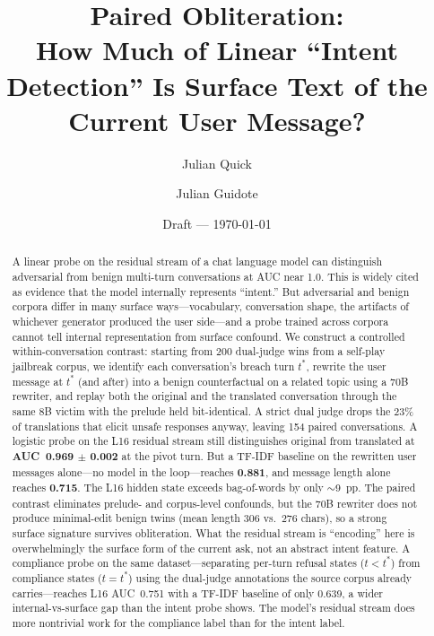 \documentclass[11pt]{article}
\title{Paired Obliteration:\\
\large How Much of Linear ``Intent Detection'' Is Surface Text of the Current User Message?}
\author{Julian Quick \and Julian Guidote}
\date{Draft --- \today}
\begin{document}
\maketitle

\begin{abstract}
A linear probe on the residual stream of a chat language model can distinguish adversarial from benign multi-turn conversations at AUC near 1.0.
This is widely cited as evidence that the model internally represents ``intent.''
But adversarial and benign corpora differ in many surface ways---vocabulary, conversation shape, the artifacts of whichever generator produced the user side---and a probe trained across corpora cannot tell internal representation from surface confound.
We construct a controlled within-conversation contrast: starting from 200 dual-judge wins from a self-play jailbreak corpus, we identify each conversation's breach turn $t^*$, rewrite the user message at $t^*$ (and after) into a benign counterfactual on a related topic using a 70B rewriter, and replay both the original and the translated conversation through the same 8B victim with the prelude held bit-identical.
A strict dual judge drops the 23\% of translations that elicit unsafe responses anyway, leaving 154 paired conversations.
A logistic probe on the L16 residual stream still distinguishes original from translated at \textbf{AUC~0.969 $\pm$ 0.002} at the pivot turn.
But a TF-IDF baseline on the rewritten user messages alone---no model in the loop---reaches \textbf{0.881}, and message length alone reaches \textbf{0.715}.
The L16 hidden state exceeds bag-of-words by only $\sim$9~pp.
The paired contrast eliminates prelude- and corpus-level confounds, but the 70B rewriter does not produce minimal-edit benign twins (mean length 306 vs.\ 276 chars), so a strong surface signature survives obliteration.
What the residual stream is ``encoding'' here is overwhelmingly the surface form of the current ask, not an abstract intent feature.
A compliance probe on the same dataset---separating per-turn refusal states ($t < t^*$) from compliance states ($t = t^*$) using the dual-judge annotations the source corpus already carries---reaches L16 AUC~0.751 with a TF-IDF baseline of only 0.639, a wider internal-vs-surface gap than the intent probe shows.  The model's residual stream does more nontrivial work for the compliance label than for the intent label.
\end{abstract}

\end{document}
